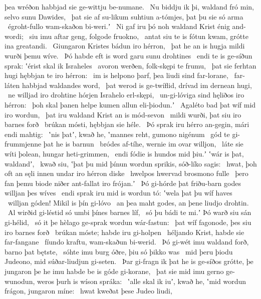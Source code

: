 þea wréðon habbjad sie ge-wittju be-numane. \hld\ Nu biddju ik þi, waldand fró min,
selvo sunu Dawides, \hld\ þat sie af su-likum suhtiun a-tómjes,
þat þu sie só arma \hld\ égroht-fullo
wam-skaðon bi-weri.ʼ \hld\ Ni gaf iru þó noh waldand Krist
énig and-wordi; \hld\ siu imu aftar geng,
folgode fruokno, \hld\ antat siu te is fótun kwam,
grótte ina greatandi. \hld\ Giungaron Kristes
bádun iro hérron, \hld\ þat he an is hugja mildi
wurði þemu wíve. \hld\ Þó habde eft is word garu
sunu drohtines \hld\ endi te is ge-síðun sprak:
ʽérist skal ik Israheles \hld\ avoron werðen,
folk-skępi te frumu, \hld\ þat sie ferhtan hugi
hębbjan te iro hérron: \hld\ im is helpono þarf,
þea liudi sind far-lorane, \hld\ far-láten habbjad
waldandes word, \hld\ þat werod is ge-twíflid,
drívad im dernean hugi, \hld\ ne willjad iro drohtine hórjen
Israhelo erl-skępi, \hld\ un-gi-lóviga sind
hęliðos iro hérron: \hld\ þoh skal þanen helpe kumen
allun eli-þiodun.ʼ \hld\ Agaléto bad
þat wíf mid iro wordun, \hld\ þat iru waldand Krist
an is mód-sevon \hld\ mildi wurði,
þat siu iro barnes forð \hld\ brúkan mósti,
hębbjan sie héle. \hld\ Þó sprak iru hérro an-gegin,
mári endi mahtig: \hld\ ʽnis þatʼ, kwað he, ʽmannes reht,
gumono nigénum \hld\ gód te gi-frummjenne
þat he is barnun \hld\ bródes af-tíhe,
wernie im ovar willjon, \hld\ láte sie wíti þolean,
hungar heti-grimmen, \hld\ endi fódie is hundos mid þiu.ʼ
ʽwár is þat, waldandʼ, \hld\ kwað siu, ʽþat þu mid þínun wordun sprikis,
sóð-líko sagis: \hld\ hwat, þoh oft an sęli innen
undar iro hérron diske \hld\ hwelpos hwervad
brosmono fulle \hld\ þero fan þemu biode niðer
ant-fallat iro frójan.ʼ \hld\ Þó gi-hórde þat friðu-barn godes
willjan þes wíves \hld\ endi sprak iru mid is wordun tó:
ʽwela þat þu wíf haves \hld\ willjan góden!
Mikil is þín gi-lóvo \hld\ an þea maht godes,
an þene liudjo drohtin. \hld\ Al wirðid gi-léstid só
umbi þínes barnes líf, \hld\ só þu bádi te mi.ʼ
Þó warð siu sán gi-hélid, \hld\ só it þe hèlago ge-sprak
wordun wár-fastun: \hld\ þat wíf fagonode,
þes siu iro barnes forð \hld\ brúkan móste;
habde iru gi-holpen \hld\ héljando Krist,
habde sie far-fangane \hld\ fíundo kraftu,
wam-skaðun bi-werid. \hld\ Þó gi-wét imu waldand forð,
barno þat bętste, \hld\ sóhte imu burg óðre,
þiu só þikko was \hld\ mid þeru þiodu Judeono,
mid súðar-liudjun gi-seten. \hld\ Þar gi-fragn ik þat he is ge-síðos grótte,
þe jungaron þe he imu habde be is góde gi-korane, \hld\ þat sie mid imu gerno ge-wunodun,
weros þurh is wíson spráka: \hld\ ʽalle skal ik iuʼ, kwað he, ʽmid wordun frágon,
jungaron míne: \hld\ hwat kweðat þese Judeo liudi,
